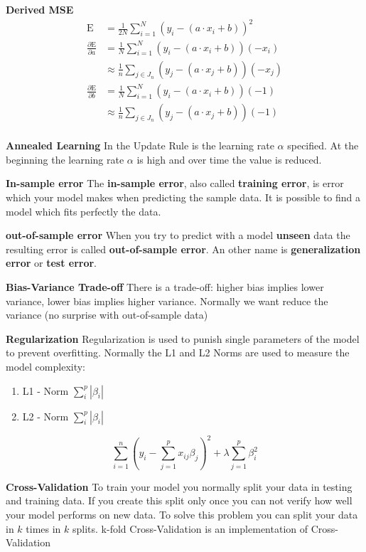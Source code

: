 \documentclass[11pt,twoside,landscape]{article}
\begin{document}
\begin{multicols}{3}
\textbf{Derived MSE}
\begin{align}
  \textrm{E} &= \frac{1}{2N} \sum_{i=1}^{N} (y_i - (a \cdot x_i + b))^2 \\
  \frac{\partial \textrm{E}}{\partial a} &= \frac{1}{N} \sum_{i=1}^{N} (y_i - (a \cdot x_i + b)) (-x_i) \\
  &\approx \frac{1}{n} \sum_{j \in J_n} (y_j - (a \cdot x_j + b)) (-x_j)  \\
  \frac{\partial \textrm{E}}{\partial b} &= \frac{1}{N} \sum_{i=1}^{N} (y_i - (a \cdot x_i + b)) (-1) \\
  &\approx \frac{1}{n} \sum_{j \in J_n} (y_{j} - (a \cdot x_{j} + b)) (-1)  \\
\end{align}


\textbf{Annealed Learning}
In the Update Rule is the learning rate \(\alpha\) specified.
At the beginning the learning rate \(\alpha\) is high and over time the value is reduced.


\textbf{In-sample error}
The \textbf{in-sample error}, also called \textbf{training error}, is error which your model makes when predicting the sample data.
It is possible to find a model which fits perfectly the data.

\textbf{out-of-sample error}
When you try to predict with a model \textbf{unseen} data the resulting error is called \textbf{out-of-sample error}.
An other name is \textbf{generalization error} or \textbf{test error}.


\textbf{Bias-Variance Trade-off}
There is a trade-off: higher bias implies lower variance, lower bias implies higher variance.
Normally we want reduce the variance (no surprise with out-of-sample data)


\textbf{Regularization}
Regularization is used to punish single parameters of the model to prevent overfitting.
Normally the L1 and L2 Norms are used to measure the model complexity:
\begin{enumerate}
\item L1 - Norm \(\sum_i^p |\beta_i|\)
\item L2 - Norm \(\sum_i^p |\beta_i|\)
\end{enumerate}

\begin{equation}
  \sum_{i=1}^n(y_i - \sum_{j=1}^p x_{ij}\beta_j)^2 + \lambda \sum_{j=1}^p\beta_i^2
\end{equation}


\textbf{Cross-Validation}
To train your model you normally split your data in testing and training data.
If you create this split only once you can not verify how well your model performs on new data.
To solve this problem you can split your data in \(k\) times in \(k\) splits.
k-fold Cross-Validation is an implementation of Cross-Validation



\end{multicols}
\end{document}
